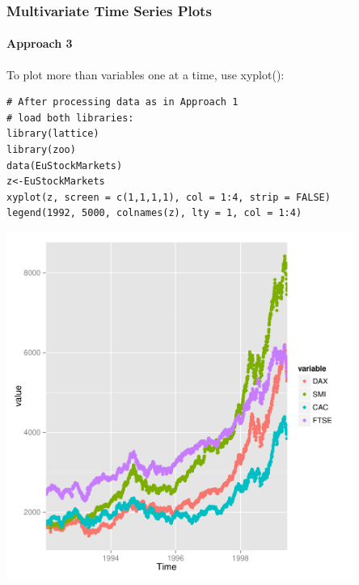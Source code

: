 \begin{frame}
 \frametitle{Multivariate Time Series Plots}
 \framesubtitle{Approach 3}

To plot more than variables one at a time, use \ttfamily xyplot(): \normalfont
		\begin{lstlisting}
# After processing data as in Approach 1
# load both libraries:
library(lattice)
library(zoo)
data(EuStockMarkets)
z<-EuStockMarkets
xyplot(z, screen = c(1,1,1,1), col = 1:4, strip = FALSE)
legend(1992, 5000, colnames(z), lty = 1, col = 1:4)
		\end{lstlisting}

       \begin{center}
         \includegraphics[width=0.85\textwidth]{images/stockPlot2}
        \end{center}
\end{frame}
%





